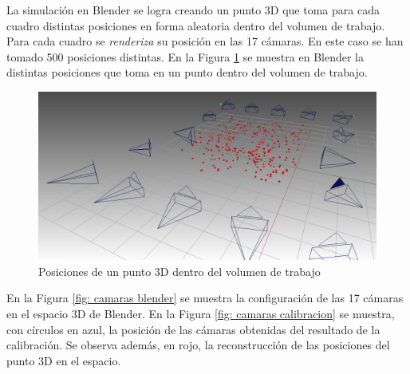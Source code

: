 La simulación en Blender se logra creando un punto 3D que toma para cada cuadro distintas posiciones en forma aleatoria dentro del volumen de trabajo. Para cada cuadro se \textit{renderiza} su posición en las 17 cámaras. En este caso se han tomado 500 posiciones distintas. En la Figura \ref{fig: blender toolbox laser} se muestra en Blender la distintas posiciones que toma en un punto dentro del volumen de trabajo.

\begin{figure}[ht!]
\begin{center}
\includegraphics[scale=0.22]{img/calibracion/blender_toolbox_laser.png}
\end{center}
\caption{Posiciones de un punto 3D dentro del volumen de trabajo}
\label{fig: blender toolbox laser}
\end{figure}

En la Figura \ref{fig: camaras blender} se muestra la configuración de las 17 cámaras en el espacio 3D de Blender. En la Figura \ref{fig: camaras calibracion} se muestra, con círculos en azul, la posición de las cámaras obtenidas del resultado de la calibración. Se observa además, en rojo, la reconstrucción de las posiciones del punto 3D en el espacio.


